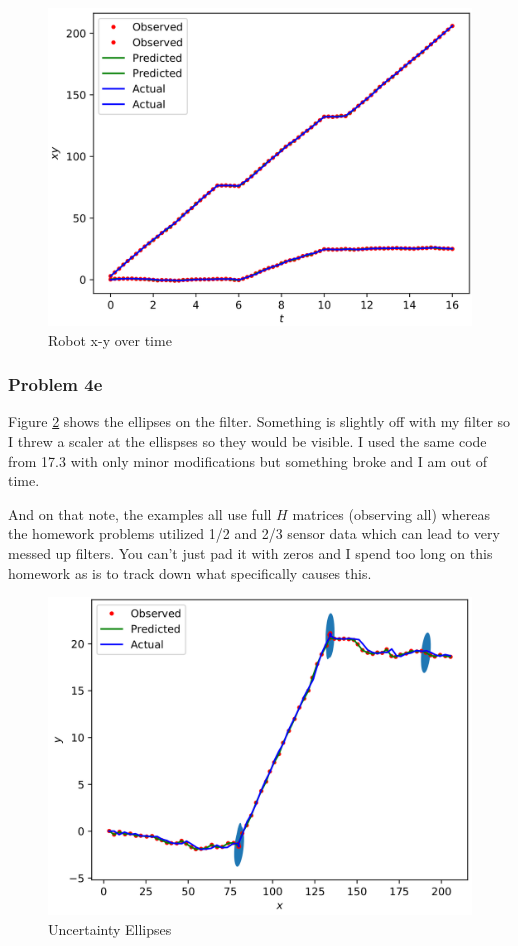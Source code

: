 \documentclass{article}
\begin{document}
\begin{figure}[h]
    \centering
    \includegraphics[scale=0.75]{problem17_4a_xy_t}
    \caption{Robot x-y over time}
    \label{fig:p17_4a_xyt}
\end{figure}

\subsubsection{Problem 4e}
Figure \ref{fig:p17_4a_ellipse} shows the ellipses on the filter. Something is 
slightly off with my filter so I threw a scaler at the ellispses so they would 
be visible. I used the same code from 17.3 with only minor modifications but 
something broke and I am out of time.

And on that note, the examples all use full $H$ matrices (observing all) whereas 
the homework problems utilized 1/2 and 2/3 sensor data which can lead to very 
messed up filters. You can't just pad it with zeros and I spend too long on 
this homework as is to track down what specifically causes this.

\begin{figure}[h]
    \centering
    \includegraphics[scale=0.75]{problem17_4a_ellipse}
    \caption{Uncertainty Ellipses}
    \label{fig:p17_4a_ellipse}
\end{figure}
\end{document}
